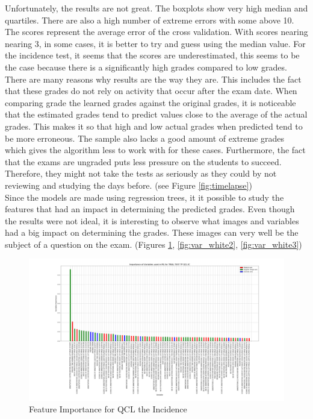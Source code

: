 \documentclass[a4paper,11pt]{report}
\numberwithin{figure}{section} %
\begin{document}
    Unfortunately, the results are not great.
    The boxplots show very high median and quartiles.
    There are also a high number of extreme errors with some above 10.
    The scores represent the average error of the cross validation.
    With scores nearing nearing 3, in some cases, it is better to try and guess using the median value.
    For the incidence test, it seems that the scores are underestimated, this seems to be the case because there is a significantly high grades compared to low grades.
    There are many reasons why results are the way they are.
    This includes the fact that these grades do not rely on activity that occur after the exam date.
    When comparing grade the learned grades against the original grades, it is noticeable that the estimated grades tend to predict values close to the average of the actual grades.
    This makes it so that high and low actual grades when predicted tend to be more erroneous.
    The sample also lacks a good amount of extreme grades which gives the algorithm less to work with for these cases.
    Furthermore, the fact that the exams are ungraded puts less pressure on the students to succeed.
    Therefore, they might not take the tests as seriously as they could by not reviewing and studying the days before. (see Figure \ref{fig:timelapse}) \\


  Since the models are made using regression trees, it it possible to study the features that had an impact in determining the predicted grades.
  Even though the results were not ideal, it is interesting to observe what images and variables had a big impact on determining the grades.
  These images can very well be the subject of a question on the exam. (Figures \ref{fig:var_white1}, \ref{fig:var_white2}, \ref{fig:var_white3})

     \begin{figure}[H]
      \centering
      \includegraphics[width=.95\linewidth]{plots/var_importance_TRIAL_TEST_TP_QCL_IC_2018-04-29_14_31_17.png}
      \caption{Feature Importance for QCL the Incidence}
      \label{fig:var_white1}
      \end{figure}
\end{document}
